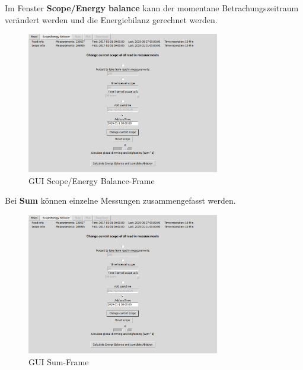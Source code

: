 \documentclass[12pt,a4paper]{article}
\newcommand{\guiplotsize}{0.75}
\begin{document}
Im Fenster \textbf{Scope/Energy balance} kann der momentane Betrachungszeitraum verändert werden und die Energiebilanz gerechnet werden. 

\begin{figure}[H]
\centering
\includegraphics[width=\guiplotsize\textwidth]{pictures/GUI/Scope_Energy_Balance_Frame.png}
\caption{GUI Scope/Energy Balance-Frame}
\label{fig:GUI Scope/Energy Balance-Frame}
\end{figure}

Bei \textbf{Sum} können einzelne Messungen zusammengefasst werden.

\begin{figure}[H]
\centering
\includegraphics[width=\guiplotsize\textwidth]{pictures/GUI/Scope_Energy_Balance_Frame.png}
\caption{GUI Sum-Frame}
\label{fig:GUI Sum-Frame}
\end{figure}
\end{document}

